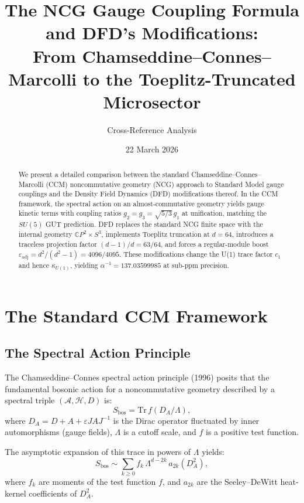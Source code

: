 \documentclass[12pt,a4paper]{article}
\title{The NCG Gauge Coupling Formula and DFD's Modifications:\\[6pt]
\large From Chamseddine--Connes--Marcolli to the Toeplitz-Truncated Microsector}
\author{Cross-Reference Analysis}
\date{22 March 2026}
\begin{document}
\maketitle

\begin{abstract}
We present a detailed comparison between the standard Chamseddine--Connes--Marcolli
(CCM) noncommutative geometry (NCG) approach to Standard Model gauge couplings
and the Density Field Dynamics (DFD) modifications thereof.  In the CCM framework,
the spectral action on an almost-commutative geometry yields gauge kinetic terms
with coupling ratios $g_2 = g_3 = \sqrt{5/3}\,g_1$ at unification, matching the
$SU(5)$ GUT prediction.  DFD replaces the standard NCG finite space with the
internal geometry $\mathbb{C}P^2 \times S^3$, implements Toeplitz truncation at
$d = 64$, introduces a traceless projection factor $(d-1)/d = 63/64$, and forces
a regular-module boost $\varepsilon_{\mathrm{adj}} = d^2/(d^2-1) = 4096/4095$.
These modifications change the U(1) trace factor $c_1$ and hence $\kappa_{U(1)}$,
yielding $\alpha^{-1} = 137.03599985$ at sub-ppm precision.
\end{abstract}

\tableofcontents
\newpage

\section{The Standard CCM Framework}
\label{sec:ccm}

\subsection{The Spectral Action Principle}

The Chamseddine--Connes spectral action principle (1996) posits that the
fundamental bosonic action for a noncommutative geometry described by a
spectral triple $(\mathcal{A}, \mathcal{H}, D)$ is:
\begin{equation}\label{eq:spectral-action}
S_{\mathrm{bos}} = \mathrm{Tr}\,f(D_A/\Lambda),
\end{equation}
where $D_A = D + A + \varepsilon JAJ^{-1}$ is the Dirac operator fluctuated by
inner automorphisms (gauge fields), $\Lambda$ is a cutoff scale, and $f$ is a
positive test function.

The asymptotic expansion of this trace in powers of $\Lambda$ yields:
\begin{equation}
S_{\mathrm{bos}} \sim \sum_{k \geq 0} f_k\,\Lambda^{d-2k}\,a_{2k}(D_A^2),
\end{equation}
where $f_k$ are moments of the test function $f$, and $a_{2k}$ are the
Seeley--DeWitt heat-kernel coefficients of $D_A^2$.
\end{document}

